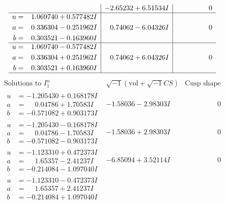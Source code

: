 \documentclass[1p]{elsarticle_modified}
\theoremstyle{definition}
\newcommand{\I}{\sqrt{-1}}
\begin{document}
$$\begin{array}{c|c|c}
 & -2.65232 + 6.51534 I & \phantom{-0.000000 } 0 \\ \hline\begin{aligned}
u &= \phantom{-}1.069740 + 0.577482 I \\
a &= \phantom{-}0.336304 - 0.251962 I \\
b &= \phantom{-}0.303521 - 0.163960 I\end{aligned}
 & \phantom{-}0.74062 - 6.04326 I & \phantom{-0.000000 } 0 \\ \hline\begin{aligned}
u &= \phantom{-}1.069740 - 0.577482 I \\
a &= \phantom{-}0.336304 + 0.251962 I \\
b &= \phantom{-}0.303521 + 0.163960 I\end{aligned}
 & \phantom{-}0.74062 + 6.04326 I & \phantom{-0.000000 } 0\\
 \hline 
 \end{array}$$\newpage$$\begin{array}{c|c|c}  
\text{Solutions to }I^u_{1}& \I (\text{vol} + \sqrt{-1}CS) & \text{Cusp shape}\\
 \hline 
\begin{aligned}
u &= -1.205430 + 0.168178 I \\
a &= \phantom{-}0.04786 + 1.70583 I \\
b &= -0.571082 + 0.903173 I\end{aligned}
 & -1.58036 - 2.98303 I & \phantom{-0.000000 } 0 \\ \hline\begin{aligned}
u &= -1.205430 - 0.168178 I \\
a &= \phantom{-}0.04786 - 1.70583 I \\
b &= -0.571082 - 0.903173 I\end{aligned}
 & -1.58036 + 2.98303 I & \phantom{-0.000000 } 0 \\ \hline\begin{aligned}
u &= -1.123310 + 0.472373 I \\
a &= \phantom{-}1.65357 - 2.41237 I \\
b &= -0.214084 - 1.097040 I\end{aligned}
 & -6.85094 + 3.52114 I & \phantom{-0.000000 } 0 \\ \hline\begin{aligned}
u &= -1.123310 - 0.472373 I \\
a &= \phantom{-}1.65357 + 2.41237 I \\
b &= -0.214084 + 1.097040 I\end{aligned}

\end{array}$$
\end{document}
